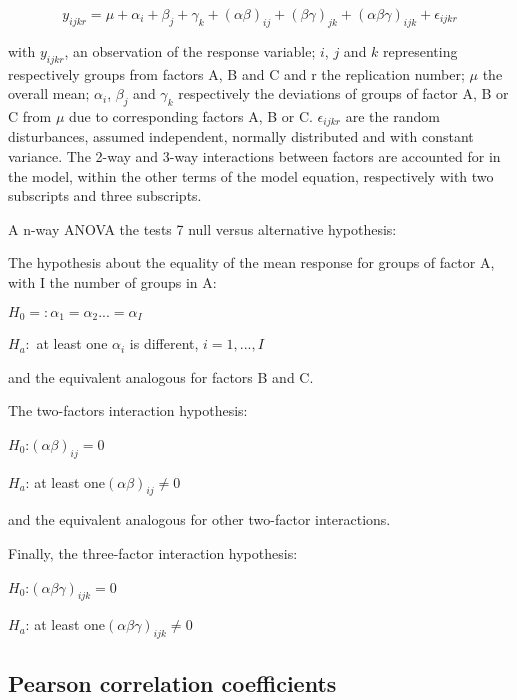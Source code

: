 \begin{equation}
y_{ijkr}=\mu + \alpha_i + \beta_j + \gamma_k +(\alpha \beta)_{ij}+(\beta \gamma)_{jk}+(\alpha \beta \gamma)_{ijk}+\epsilon_{ijkr}
\end{equation}

with $y_{ijkr}$, an observation of the response variable; $i$, $j$ and $k$ representing respectively groups from factors A, B and C and r the replication number; $\mu$ the overall mean; $\alpha_i$, $\beta_j$ and $\gamma_k$ respectively the deviations of groups of factor A, B or C from $\mu$ due to corresponding factors A, B or C. $\epsilon_{ijkr}$ are the random disturbances, assumed independent, normally distributed and with constant variance. The 2-way and 3-way interactions between factors are accounted for in the model, within the other terms of the model equation, respectively with two subscripts and three subscripts.

A n-way ANOVA the tests 7 null versus alternative hypothesis:

The hypothesis about the equality of the mean response for groups of factor A, with I the number of groups in A:

\begin{center}
$H_0=: \alpha_1=\alpha_2...=\alpha_I$

$H_a:$ at least one $\alpha_i$ is different, $i=1,...,I$
\end{center}

and the equivalent analogous for factors B and C.

The two-factors interaction hypothesis:

\begin{center}

$H_0$:$(\alpha \beta)_{ij}=0$

$H_a$: at least one$(\alpha \beta)_{ij}\neq 0$

\end{center}

and the equivalent analogous for other two-factor interactions.

Finally, the three-factor interaction hypothesis:

\begin{center}
$H_0$:$(\alpha \beta \gamma)_{ijk}=0$

$H_a$: at least one$(\alpha \beta \gamma)_{ijk}\neq 0$
\end{center}

\subsection{Pearson correlation coefficients}
\label{subsec:subcsectionC}

